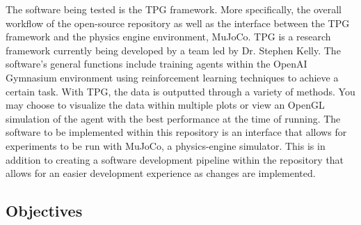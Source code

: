 \documentclass[12pt, titlepage]{article}
\begin{document}
The software being tested is the TPG framework. More specifically, the overall workflow of the open-source repository as well as the interface between the TPG framework and the physics engine environment, MuJoCo. TPG is a research framework currently being developed by a team led by Dr. Stephen Kelly. The software’s general functions include training agents within the OpenAI Gymnasium environment using reinforcement learning techniques to achieve a certain task. With TPG, the data is outputted through a variety of methods. You may choose to visualize the data within multiple plots or view an OpenGL simulation of the agent with the best performance at the time of running. The software to be implemented within this repository is an interface that allows for experiments to be run with MuJoCo, a physics-engine simulator. This is in addition to creating a software development pipeline within the repository that allows for an easier development experience as changes are implemented. 

\subsection{Objectives}



\end{document}
